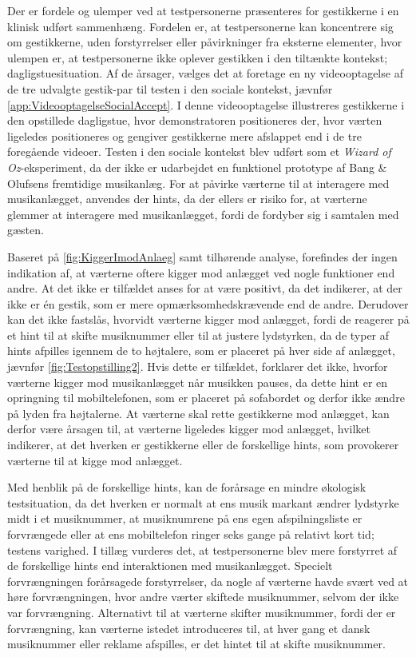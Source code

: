 Der er fordele og ulemper ved at testpersonerne præsenteres for gestikkerne i en klinisk udført sammenhæng. Fordelen er, at testpersonerne kan koncentrere sig om gestikkerne, uden forstyrrelser eller påvirkninger fra eksterne elementer, hvor ulempen er, at testpersonerne ikke oplever gestikken i den tiltænkte kontekst; dagligstuesituation. Af de årsager, vælges det at foretage en ny videooptagelse af de tre udvalgte gestik-par til testen i den sociale kontekst, jævnfør \autoref{app:VideooptagelseSocialAccept}. I denne videooptagelse illustreres gestikkerne i den opstillede dagligstue, hvor demonstratoren positioneres der, hvor værten ligeledes positioneres og gengiver gestikkerne mere afslappet end i de tre foregående videoer.\blankline 
%
Testen i den sociale kontekst blev udført som et \textit{Wizard of Oz}-eksperiment, da der ikke er udarbejdet en funktionel prototype af Bang $\&$ Olufsens fremtidige musikanlæg. For at påvirke værterne til at interagere med musikanlægget, anvendes der hints, da der ellers er risiko for, at værterne glemmer at interagere med musikanlægget, fordi de fordyber sig i samtalen med gæsten. 

Baseret på \autoref{fig:KiggerImodAnlaeg} samt tilhørende analyse, forefindes der ingen indikation af, at værterne oftere kigger mod anlægget ved nogle funktioner end andre. At det ikke er tilfældet anses for at være positivt, da det indikerer, at der ikke er én gestik, som er mere opmærksomhedskrævende end de andre. Derudover kan det ikke fastslås, hvorvidt værterne kigger mod anlægget, fordi de reagerer på et hint til at skifte musiknummer eller til at justere lydstyrken, da de typer af hints afpilles igennem de to højtalere, som er placeret på hver side af anlægget, jævnfør \autoref{fig:Testopstilling2}. Hvis dette er tilfældet, forklarer det ikke, hvorfor værterne kigger mod musikanlægget når musikken pauses, da dette hint er en opringning til mobiltelefonen, som er placeret på sofabordet og derfor ikke ændre på lyden fra højtalerne. At værterne skal rette gestikkerne mod anlægget, kan derfor være årsagen til, at værterne ligeledes kigger mod anlægget, hvilket indikerer, at det hverken er gestikkerne eller de forskellige hints, som provokerer værterne til at kigge mod anlægget.     

Med henblik på de forskellige hints, kan de forårsage en mindre økologisk testsituation, da det hverken er normalt at ens musik markant ændrer lydstyrke midt i et musiknummer, at musiknumrene på ens egen afspilningsliste er forvrængede eller at ens mobiltelefon ringer seks gange på relativt kort tid; testens varighed. I tillæg vurderes det, at testpersonerne blev mere forstyrret af de forskellige hints end interaktionen med musikanlægget. Specielt forvrængningen forårsagede forstyrrelser, da nogle af værterne havde svært ved at høre forvrængningen, hvor andre værter skiftede musiknummer, selvom der ikke var forvrængning. Alternativt til at værterne skifter musiknummer, fordi der er forvrængning, kan værterne istedet introduceres til, at hver gang et dansk musiknummer eller reklame afspilles, er det hintet til at skifte musiknummer.

